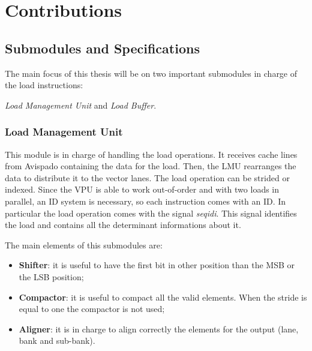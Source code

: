 \chapter{Contributions}

\section{Submodules and Specifications}

The main focus of this thesis will be on two important submodules in charge of the load instructions:

\textit{Load Management Unit} and \textit{Load Buffer}.

\subsection{Load Management Unit}


This module is in charge of handling the load operations. It receives cache lines from Avispado containing the data for the load. Then, the LMU rearranges the data to distribute it to the vector lanes.
The load operation can be strided or indexed.
Since the VPU is able to work out-of-order and with two loads in parallel, an ID system is necessary, so each instruction comes with an ID.
In particular the load operation comes with the signal \emph{seq\+id\+i}.
This signal identifies the load and contains all the determinant informations about it.

The main elements of this submodules are:
\begin{itemize}
    \item \textbf{Shifter}: it is useful to have the first bit in other position than the MSB or the LSB position;
    
    \item \textbf{Compactor}: it is useful to compact all the valid elements. When the stride is equal to one the compactor is not used;
    
    \item \textbf{Aligner}: it is in charge to align correctly the elements for the output (lane, bank and sub-bank).
\end{itemize}


